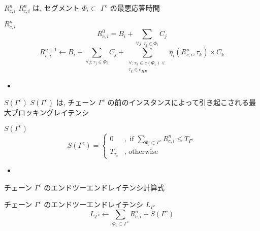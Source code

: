\begin{frame}{$R_{c, i}^{n}$}
    $R_{c, i}^{n}$ は, セグメント $\Phi_{i} \subset$  $\Gamma^{c}$ の最悪応答時間
    \begin{block}{$R_{c, i}^{n}$}
        \begin{equation*}
            R_{c, i}^{0}=B_{i}+ \sum_{\forall j: \tau_{j} \in \Phi_{i}} C_{j}
        \end{equation*}
        \begin{equation*}
            R_{c, i}^{n+1} \leftarrow B_{i}+\sum_{\forall j: \tau_{j} \in \Phi_{i}} C_{j}+\sum_{\substack{\forall: \tau_{k} \in e\left(\Phi_{i}\right) \vee \\ \tau_{k} \in e_{H P}}} \eta_{i}\left(R_{c, i}^{n}, \tau_{k}\right) \times C_{k}
        \end{equation*}

        \setlength{\linewidth}{0.98\columnwidth}
        \begin{itemize}
            \item {}
        \end{itemize}
    \end{block}
\end{frame}

\begin{frame}{$S\left(\Gamma^{c}\right)$}
    $S\left(\Gamma^{c}\right)$ は, チェーン $\Gamma^{c}$ の前のインスタンスによって引き起こされる最大ブロッキングレイテンシ
    \begin{block}{$S\left(\Gamma^{c}\right)$}
        \begin{equation*}
            S\left(\Gamma^{c}\right)= \begin{cases}0 &, \text { if } \sum_{\Phi_{i} \subset \Gamma^{c}} R_{c, i}^{n} \leq T_{\Gamma^{c}} \\ T_{\tau_{s}} &, \text { otherwise }\end{cases}
        \end{equation*}

        \setlength{\linewidth}{0.98\columnwidth}
        \begin{itemize}
            \item {}
        \end{itemize}
    \end{block}
\end{frame}

\begin{frame}{チェーン $\Gamma^{c}$ のエンドツーエンドレイテンシ計算式}
    \begin{block}{チェーン $\Gamma^{c}$ のエンドツーエンドレイテンシ $L_{\Gamma^{c}}$}
        \begin{equation*}
            L_{\Gamma^{c}} \leftarrow \sum_{\Phi_{i} \subset \Gamma^{c}} R_{c, i}^{n}+S\left(\Gamma^{c}\right)
        \end{equation*}
    \end{block}
\end{frame}

